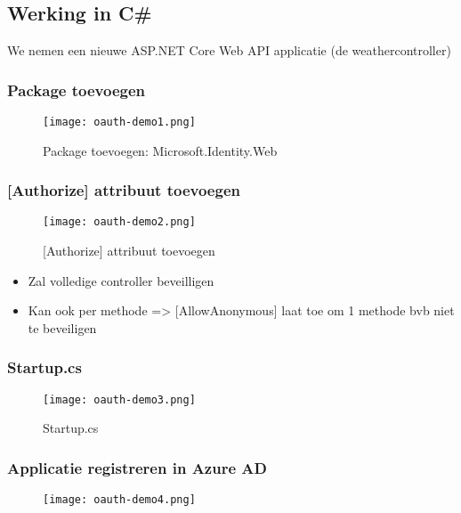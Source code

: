 \documentclass{article}
\begin{document}
\subsection{Werking in C\#}

We nemen een nieuwe ASP.NET Core Web API applicatie (de weathercontroller)

\subsubsection{Package toevoegen}

\begin{figure}[H]
    \centering
    \texttt{[image: oauth-demo1.png]}
    \caption{Package toevoegen: Microsoft.Identity.Web}
\end{figure}

\subsubsection{{[}Authorize{]} attribuut toevoegen}

\begin{figure}[H]
    \centering
    \texttt{[image: oauth-demo2.png]}
    \caption{{[}Authorize{]} attribuut toevoegen}
\end{figure}

\begin{itemize}
    \item Zal volledige controller beveilligen
    \item Kan ook per methode => {[}AllowAnonymous{]} laat toe om 1 methode bvb niet te beveiligen
\end{itemize}

\subsubsection{Startup.cs}

\begin{figure}[H]
    \centering
    \texttt{[image: oauth-demo3.png]}
    \caption{Startup.cs}
\end{figure}

\subsubsection{Applicatie registreren in Azure AD}

\begin{figure}[H]
    \centering
    \texttt{[image: oauth-demo4.png]}
\end{figure}
\end{document}
